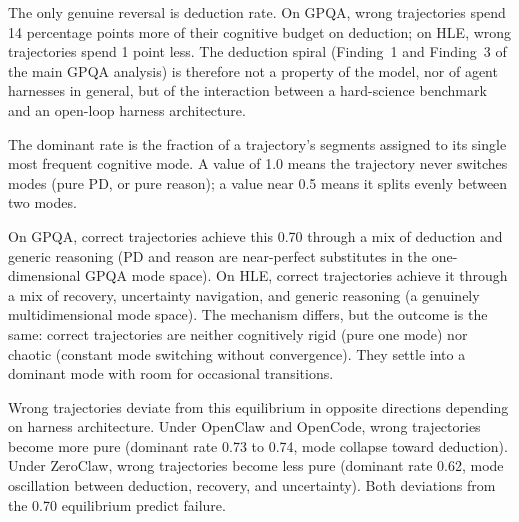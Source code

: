 The only genuine reversal is deduction rate.
On GPQA, wrong trajectories spend 14 percentage points more of their
cognitive budget on deduction; on HLE, wrong trajectories spend 1 point
less.
The deduction spiral (Finding~1 and Finding~3 of the main GPQA analysis) is
therefore not a property of the model, nor of agent harnesses in general,
but of the interaction between a hard-science benchmark and an open-loop
harness architecture.


The dominant rate is the fraction of a trajectory's segments assigned to
its single most frequent cognitive mode.
A value of 1.0 means the trajectory never switches modes (pure PD, or pure
reason); a value near 0.5 means it splits evenly between two modes.

On GPQA, correct trajectories achieve this 0.70 through a mix of deduction
and generic reasoning (PD and reason are near-perfect substitutes in the
one-dimensional GPQA mode space).
On HLE, correct trajectories achieve it through a mix of recovery,
uncertainty navigation, and generic reasoning (a genuinely multidimensional
mode space).
The mechanism differs, but the outcome is the same: correct trajectories
are neither cognitively rigid (pure one mode) nor chaotic (constant mode
switching without convergence).
They settle into a dominant mode with room for occasional transitions.

Wrong trajectories deviate from this equilibrium in opposite directions
depending on harness architecture.
Under OpenClaw and OpenCode, wrong trajectories become more pure (dominant
rate 0.73 to 0.74, mode collapse toward deduction).
Under ZeroClaw, wrong trajectories become less pure (dominant rate 0.62,
mode oscillation between deduction, recovery, and uncertainty).
Both deviations from the 0.70 equilibrium predict failure.
